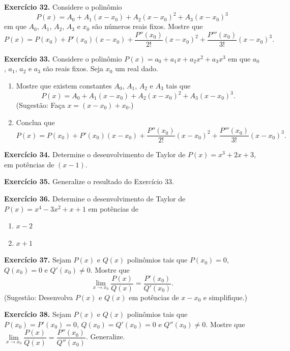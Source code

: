 \documentclass[12pt,a4paper]{article}
\begin{document}
\vspace{0.5cm}
\noindent\textbf{Exercício 32.}
Considere o polinômio
\[
P(x) = A_0 + A_1 (x - x_0) + A_2 (x - x_0)^2 + A_3 (x - x_0)^3
\]
em que $A_0$, $A_1$, $A_2$, $A_3$ e $x_0$ são números reais fixos. Mostre que
\[
P(x) = P(x_0) + P'(x_0)(x - x_0) + \dfrac{P''(x_0)}{2!}(x - x_0)^2 + \dfrac{P'''(x_0)}{3!}(x - x_0)^3.
\]

\vspace{0.5cm}
\noindent\textbf{Exercício 33.} Considere o polinômio $P(x) = a_0 + a_1 x + a_2 x^2 + a_3 x^3$ em que $a_0$, $a_1$, $a_2$ e $a_3$ são reais fixos. Seja $x_0$ um real dado.
\begin{enumerate}
    \renewcommand{\theenumi}{\alph{enumi}}
    \renewcommand{\labelenumi}{\theenumi)}
    \item Mostre que existem constantes $A_0$, $A_1$, $A_2$ e $A_3$ tais que
    \[
    P(x) = A_0 + A_1 (x - x_0) + A_2 (x - x_0)^2 + A_3 (x - x_0)^3.
    \]
    (Sugestão: Faça $x = (x - x_0) + x_0$.)
    \item Conclua que
    \[
    P(x) = P(x_0) + P'(x_0)(x - x_0) + \dfrac{P''(x_0)}{2!}(x - x_0)^2 + \dfrac{P'''(x_0)}{3!}(x - x_0)^3.
    \]
\end{enumerate}

\vspace{0.5cm}
\noindent\textbf{Exercício 34.}
Determine o desenvolvimento de Taylor de $P(x) = x^3 + 2x + 3$, em potências de $(x - 1)$.

\vspace{0.5cm}
\noindent\textbf{Exercício 35.}
Generalize o resultado do Exercício 33.

\vspace{0.5cm}
\noindent\textbf{Exercício 36.} Determine o desenvolvimento de Taylor de $P(x) = x^4 - 3x^2 + x + 1$ em potências de
\begin{enumerate}
    \renewcommand{\theenumi}{\alph{enumi}}
    \renewcommand{\labelenumi}{\theenumi)}
    \item $x - 2$
    \item $x + 1$
\end{enumerate}

\vspace{0.5cm}
\noindent\textbf{Exercício 37.}
Sejam $P(x)$ e $Q(x)$ polinômios tais que $P(x_0) = 0$, $Q(x_0) = 0$ e $Q'(x_0) \neq 0$. Mostre que
\[
\lim_{x \to x_0} \dfrac{P(x)}{Q(x)} = \dfrac{P'(x_0)}{Q'(x_0)}.
\]
(Sugestão: Desenvolva $P(x)$ e $Q(x)$ em potências de $x - x_0$ e simplifique.)

\vspace{0.5cm}
\noindent\textbf{Exercício 38.}
Sejam $P(x)$ e $Q(x)$ polinômios tais que $P(x_0) = P'(x_0) = 0$, $Q(x_0) = Q'(x_0) = 0$ e $Q''(x_0) \neq 0$. Mostre que $\lim\limits_{x \to x_0} \dfrac{P(x)}{Q(x)} = \dfrac{P''(x_0)}{Q''(x_0)}$. Generalize.
\end{document}
